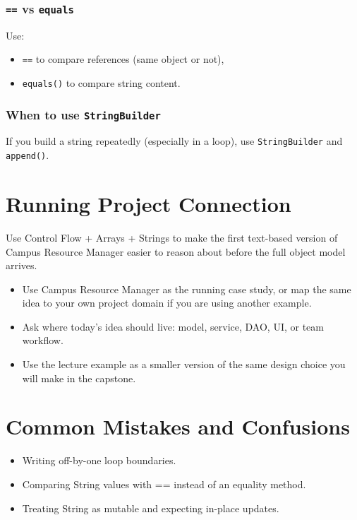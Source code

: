 \documentclass[11pt]{article}
\begin{document}
\subsubsection{\texttt{==} vs \texttt{equals}}
Use:
\begin{itemize}
  \item \texttt{==} to compare references (same object or not),
  \item \texttt{equals()} to compare string content.
\end{itemize}

\subsubsection{When to use \texttt{StringBuilder}}
If you build a string repeatedly (especially in a loop), use \texttt{StringBuilder} and \texttt{append()}.
\notesources{\OOPSUnitISources}

\section{Running Project Connection}
Use Control Flow + Arrays + Strings to make the first text-based version of Campus Resource Manager easier to reason about before the full object model arrives.
\begin{itemize}
  \item Use Campus Resource Manager as the running case study, or map the same idea to your own project domain if you are using another example.
  \item Ask where today's idea should live: model, service, DAO, UI, or team workflow.
  \item Use the lecture example as a smaller version of the same design choice you will make in the capstone.
\end{itemize}
\notesources{\OOPSUnitISources}

\section{Common Mistakes and Confusions}
\begin{itemize}
  \item Writing off-by-one loop boundaries.
  \item Comparing String values with == instead of an equality method.
  \item Treating String as mutable and expecting in-place updates.
\end{itemize}
\notesources{\OOPSUnitISources}
\end{document}
